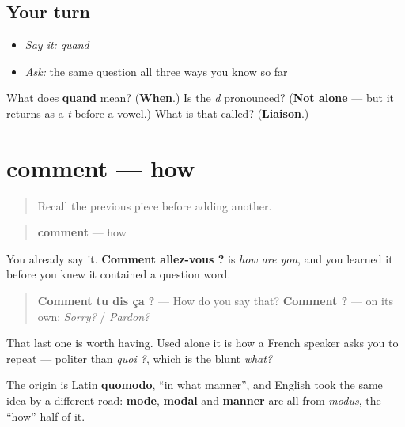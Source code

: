 \subsection*{Your turn}
\begin{itemize}
\raggedright
  \item \emph{Say it:} \emph{quand}
  \item \emph{Ask:} the same question all three ways you know so far
\end{itemize}

\begin{tcolorbox}[breakable,colback=teal!4,colframe=teal!35!black,title={Before you move on}]
What does \textbf{quand} mean? (\textbf{When}.) Is the \emph{d} pronounced? (\textbf{Not alone} — but it returns as a \emph{t} before a vowel.) What is that called? (\textbf{Liaison}.)
\end{tcolorbox}
\section[comment]{comment — how}

\label{lesson:FR-C32-comment}



\begin{quote}
Recall the previous piece before adding another.
\end{quote}

\begin{cousinweb}
\begin{quote}
\textbf{comment} — how
\end{quote}

You already say it. \textbf{Comment allez-vous ?} is \emph{how are you}, and you learned it before you knew it contained a question word.

\begin{quote}
\textbf{Comment tu dis ça ?} — How do you say that? \textbf{Comment ?} — on its own: \emph{Sorry?} / \emph{Pardon?}
\end{quote}

That last one is worth having. Used alone it is how a French speaker asks you to repeat — politer than \emph{quoi ?}, which is the blunt \emph{what?}

The origin is Latin \textbf{quomodo}, \textquotedblleft{}in what manner\textquotedblright{}, and English took the same idea by a different road: \textbf{mode}, \textbf{modal} and \textbf{manner} are all from \emph{modus}, the \textquotedblleft{}how\textquotedblright{} half of it.
\end{cousinweb}

